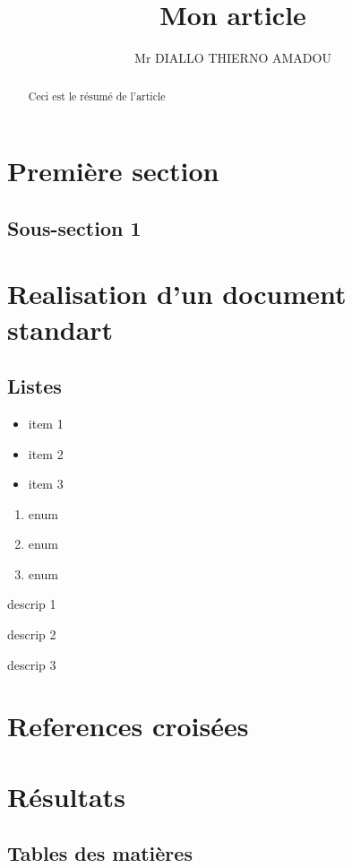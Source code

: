 \documentclass{article}
\title{Mon article}
\author{Mr DIALLO THIERNO AMADOU}
\begin{document}
\maketitle

\begin{abstract}
Ceci est le résumé de l'article
\end{abstract}

\section{Première section}
\subsection{Sous-section 1}

\section{Realisation d'un document standart}
\subsection{Listes}
\begin{itemize}
\item item 1
\item item 2
\item item 3
\end{itemize}

\begin{enumerate}
\item enum
\item enum
\item enum
\end{enumerate}

\begin{description}
\item descrip 1
\item descrip 2
\item descrip 3
\end{description}
\section{References croisées}
\section{Résultats}
\label{resultats}

\subsection{Tables des matières}
\end{document}

